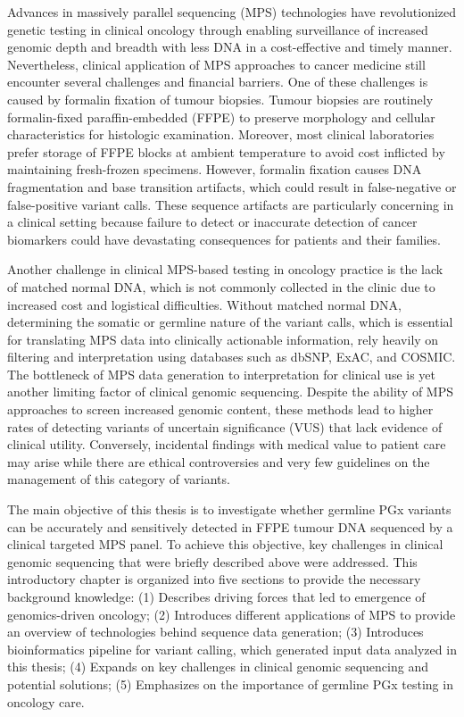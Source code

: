 Advances in massively parallel sequencing (MPS) technologies have revolutionized genetic testing in clinical oncology through enabling surveillance of increased genomic depth and breadth with less DNA in a cost-effective and timely manner. Nevertheless, clinical application of MPS approaches to cancer medicine still encounter several challenges and financial barriers. One of these challenges is caused by formalin fixation of tumour biopsies. Tumour biopsies are routinely formalin-fixed paraffin-embedded (FFPE) to preserve morphology and cellular characteristics for histologic examination. Moreover, most clinical laboratories prefer storage of FFPE blocks at ambient temperature to avoid cost inflicted by maintaining fresh-frozen specimens. However, formalin fixation causes DNA fragmentation and base transition artifacts, which could result in false-negative or false-positive variant calls. These sequence artifacts are particularly concerning in a clinical setting because failure to detect or inaccurate detection of cancer biomarkers could have devastating consequences for patients and their families.

Another challenge in clinical MPS-based testing in oncology practice is the lack of matched normal DNA, which is not commonly collected in the clinic due to increased cost and logistical difficulties. Without matched normal DNA, determining the somatic or germline nature of the variant calls, which is essential for translating MPS data into clinically actionable information, rely heavily on filtering and interpretation using databases such as dbSNP, ExAC, and COSMIC. The bottleneck of MPS data generation to interpretation for clinical use is yet another limiting factor of clinical genomic sequencing. Despite the ability of MPS approaches to screen increased genomic content, these methods lead to higher rates of detecting variants of uncertain significance (VUS) that lack evidence of clinical utility. Conversely, incidental findings with medical value to patient care may arise while there are ethical controversies and very few guidelines on the management of this category of variants.

The main objective of this thesis is to investigate whether germline PGx variants can be accurately and sensitively detected in FFPE tumour DNA sequenced by a clinical targeted MPS panel. To achieve this objective, key challenges in clinical genomic sequencing that were briefly described above were addressed. This introductory chapter is organized into five sections to provide the necessary background knowledge: (1) Describes driving forces that led to emergence of genomics-driven oncology; (2) Introduces different applications of MPS to provide an overview of technologies behind sequence data generation; (3) Introduces bioinformatics pipeline for variant calling, which generated input data analyzed in this thesis; (4) Expands on key challenges in clinical genomic sequencing and potential solutions; (5) Emphasizes on the importance of germline PGx testing in oncology care.

